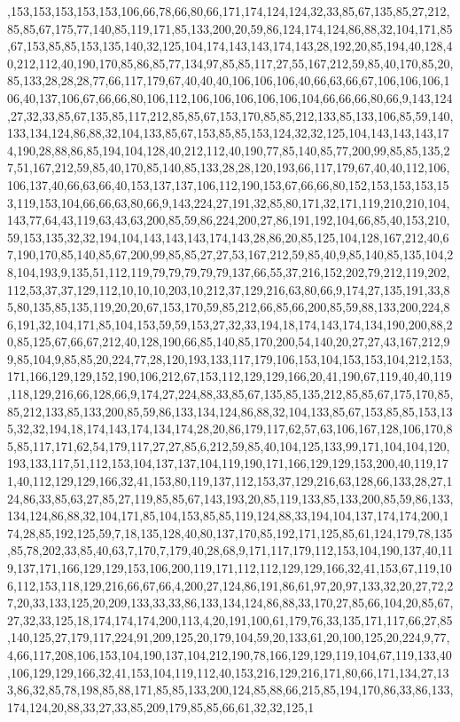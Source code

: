 ,153,153,153,153,153,106,66,78,66,80,66,171,174,124,124,32,33,85,67,135,85,27,212,85,85,67,175,77,140,85,119,171,85,133,200,20,59,86,124,174,124,86,88,32,104,171,85,67,153,85,85,153,135,140,32,125,104,174,143,143,174,143,28,192,20,85,194,40,128,40,212,112,40,190,170,85,86,85,77,134,97,85,85,117,27,55,167,212,59,85,40,170,85,20,85,133,28,28,28,77,66,117,179,67,40,40,40,106,106,106,40,66,63,66,67,106,106,106,106,40,137,106,67,66,66,80,106,112,106,106,106,106,106,104,66,66,66,80,66,9,143,124,27,32,33,85,67,135,85,117,212,85,85,67,153,170,85,85,212,133,85,133,106,85,59,140,133,134,124,86,88,32,104,133,85,67,153,85,85,153,124,32,32,125,104,143,143,143,174,190,28,88,86,85,194,104,128,40,212,112,40,190,77,85,140,85,77,200,99,85,85,135,27,51,167,212,59,85,40,170,85,140,85,133,28,28,120,193,66,117,179,67,40,40,112,106,106,137,40,66,63,66,40,153,137,137,106,112,190,153,67,66,66,80,152,153,153,153,153,119,153,104,66,66,63,80,66,9,143,224,27,191,32,85,80,171,32,171,119,210,210,104,143,77,64,43,119,63,43,63,200,85,59,86,224,200,27,86,191,192,104,66,85,40,153,210,59,153,135,32,32,194,104,143,143,143,174,143,28,86,20,85,125,104,128,167,212,40,67,190,170,85,140,85,67,200,99,85,85,27,27,53,167,212,59,85,40,9,85,140,85,135,104,28,104,193,9,135,51,112,119,79,79,79,79,79,137,66,55,37,216,152,202,79,212,119,202,112,53,37,37,129,112,10,10,10,203,10,212,37,129,216,63,80,66,9,174,27,135,191,33,85,80,135,85,135,119,20,20,67,153,170,59,85,212,66,85,66,200,85,59,88,133,200,224,86,191,32,104,171,85,104,153,59,59,153,27,32,33,194,18,174,143,174,134,190,200,88,20,85,125,67,66,67,212,40,128,190,66,85,140,85,170,200,54,140,20,27,27,43,167,212,99,85,104,9,85,85,20,224,77,28,120,193,133,117,179,106,153,104,153,153,104,212,153,171,166,129,129,152,190,106,212,67,153,112,129,129,166,20,41,190,67,119,40,40,119,118,129,216,66,128,66,9,174,27,224,88,33,85,67,135,85,135,212,85,85,67,175,170,85,85,212,133,85,133,200,85,59,86,133,134,124,86,88,32,104,133,85,67,153,85,85,153,135,32,32,194,18,174,143,174,134,174,28,20,86,179,117,62,57,63,106,167,128,106,170,85,85,117,171,62,54,179,117,27,27,85,6,212,59,85,40,104,125,133,99,171,104,104,120,193,133,117,51,112,153,104,137,137,104,119,190,171,166,129,129,153,200,40,119,171,40,112,129,129,166,32,41,153,80,119,137,112,153,37,129,216,63,128,66,133,28,27,124,86,33,85,63,27,85,27,119,85,85,67,143,193,20,85,119,133,85,133,200,85,59,86,133,134,124,86,88,32,104,171,85,104,153,85,85,119,124,88,33,194,104,137,174,174,200,174,28,85,192,125,59,7,18,135,128,40,80,137,170,85,192,171,125,85,61,124,179,78,135,85,78,202,33,85,40,63,7,170,7,179,40,28,68,9,171,117,179,112,153,104,190,137,40,119,137,171,166,129,129,153,106,200,119,171,112,112,129,129,166,32,41,153,67,119,106,112,153,118,129,216,66,67,66,4,200,27,124,86,191,86,61,97,20,97,133,32,20,27,72,27,20,33,133,125,20,209,133,33,33,86,133,134,124,86,88,33,170,27,85,66,104,20,85,67,27,32,33,125,18,174,174,174,200,113,4,20,191,100,61,179,76,33,135,171,117,66,27,85,140,125,27,179,117,224,91,209,125,20,179,104,59,20,133,61,20,100,125,20,224,9,77,4,66,117,208,106,153,104,190,137,104,212,190,78,166,129,129,119,104,67,119,133,40,106,129,129,166,32,41,153,104,119,112,40,153,216,129,216,171,80,66,171,134,27,133,86,32,85,78,198,85,88,171,85,85,133,200,124,85,88,66,215,85,194,170,86,33,86,133,174,124,20,88,33,27,33,85,209,179,85,85,66,61,32,32,125,1